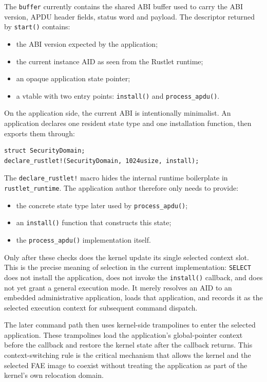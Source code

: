 The \texttt{buffer} currently contains the shared ABI buffer used to
carry the ABI version, APDU header fields, status word and payload. The
descriptor returned by \texttt{start()} contains:
\begin{itemize}
\item the ABI version expected by the application;
\item the current instance AID as seen from the Rustlet runtime;
\item an opaque application state pointer;
\item a vtable with two entry points:
  \texttt{install()} and \texttt{process\_apdu()}.
\end{itemize}

On the application side, the current ABI is intentionally minimalist.
An application declares one resident state type and one installation
function, then exports them through:

\begin{verbatim}
struct SecurityDomain;
declare_rustlet!(SecurityDomain, 1024usize, install);
\end{verbatim}

The \texttt{declare\_rustlet!} macro hides the internal runtime
boilerplate in \texttt{rustlet\_runtime}. The
application author therefore only needs to provide:
\begin{itemize}
\item the concrete state type later used by
  \texttt{process\_apdu()};
\item an \texttt{install()} function that constructs this state;
\item the \texttt{process\_apdu()} implementation itself.
\end{itemize}

Only after these checks does the kernel update its single selected
context slot. This is the precise meaning of selection in the current
implementation: \texttt{SELECT} does not install the application, does
not invoke the \texttt{install()} callback, and does not yet grant a
general execution mode. It merely resolves an AID to an embedded
administrative application, loads that application, and records it as
the selected execution context for subsequent command dispatch.

The later command path then uses kernel-side trampolines to enter the
selected application. These trampolines load the application's
global-pointer context before the callback and restore the kernel state
after the callback returns. This context-switching rule is the critical
mechanism that allows the kernel and the selected FAE image to coexist
without treating the application as part of the kernel's own relocation
domain.

